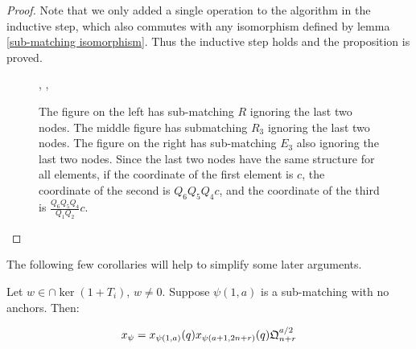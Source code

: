 \documentclass{amsart}
\begin{document}
\begin{proof}
	Note that we only added a single operation to the algorithm in the inductive step, which also commutes with any isomorphism defined by lemma \ref{sub-matching isomorphism}. Thus the inductive step holds and the proposition is proved.
	
	\begin{figure}
		\def\cbasisspacing{1mm}
		\begin{adjustbox}{width=\textwidth}
			, \hspace{\cbasisspacing}
			, \hspace{\cbasisspacing}
		\end{adjustbox}
		
		\caption{The figure on the left has sub-matching $R$ ignoring the last two nodes. The middle figure has submatching $R_3$ ignoring the last two nodes. The figure on the right has sub-matching $E_3$ also ignoring the last two nodes. Since the last two nodes have the same structure for all elements, if the coordinate of the first element is $c$, the coordinate of the second is $Q_6Q_5Q_4c$, and the coordinate of the third is $\frac{Q_6Q_5Q_4}{Q_1Q_2}c$.}
		
		\label{kernel induct characterization example}
	\end{figure}
	
\end{proof}

\vspace{5mm}
The following few corollaries will help to simplify some later arguments.

\begin{corollary}
	Let $w\in\cap\ker(1+T_i)$, $w\not=0$. Suppose $\psi(1,a)$ is a sub-matching with no anchors. Then:
	
	$$x_\psi=x_{\psi(1,a)}(q)x_{\psi(a+1,2n+r)}(q)\mathfrak{Q}^{a/2}_{n+r}$$
	
	\label{characterization generalization}
\end{corollary}
\end{document}
